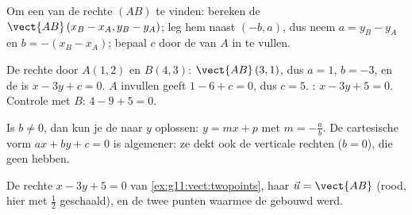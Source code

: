\begin{method}\label{met:g11:vect:twopoints}
Om een  van de rechte $(AB)$ te vinden: bereken de
 $\vect{AB}\,(x_B - x_A, y_B - y_A)$; leg hem naast $(-b, a)$,
dus neem $a = y_B - y_A$ en $b = -(x_B - x_A)$; bepaal $c$ door de
 van $A$ in te vullen.
\end{method}

\begin{example}\label{ex:g11:vect:twopoints}
De rechte door $A(1, 2)$ en $B(4, 3)$: $\vect{AB}\,(3, 1)$, dus $a = 1$,
$b = -3$, en de  is $x - 3y + c = 0$. $A$ invullen geeft
$1 - 6 + c = 0$, dus $c = 5$. : $x - 3y + 5 = 0$. Controle met
$B$: $4 - 9 + 5 = 0$.
\end{example}

\begin{remark}
Is $b \neq 0$, dan kun je de  naar $y$ oplossen: $y = mx + p$
met  $m = -\frac ab$. De cartesische vorm
$ax + by + c = 0$ is algemener: ze dekt ook de verticale rechten ($b = 0$),
die geen  hebben.
\end{remark}

\begin{omfigure}

{\small De rechte $x - 3y + 5 = 0$ van \cref{ex:g11:vect:twopoints}, haar
 $\vec u = \vect{AB}$ (rood, hier met $\frac12$ geschaald), en
de twee punten waarmee de  gebouwd werd.}
\end{omfigure}

